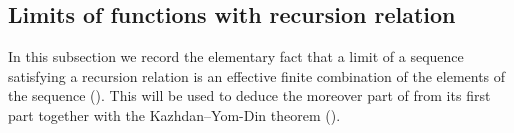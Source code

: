 \documentclass[12pt,a4paper]{amsart}%
\begin{document}

\subsection{Limits of functions with recursion relation}\label{ssec:lim}
In this subsection we record the
elementary fact that a limit of a sequence satisfying a recursion relation is an effective
finite combination of the elements of the sequence (). This will be used to deduce the moreover part of  from its first part together with  the Kazhdan--Yom-Din theorem ().
\end{document}

